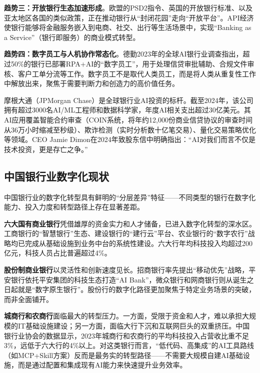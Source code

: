 \textbf{趋势三：开放银行生态加速形成}。欧盟的PSD2指令、英国的开放银行标准、以及亚太地区各国的类似政策，正在推动银行从``封闭花园''走向``开放平台''。API经济使银行能够将金融服务嵌入到电商、社交、出行等生活场景中，实现``Banking as a Service''（银行即服务）的商业模式转型。

\textbf{趋势四：数字员工与人机协作常态化}。德勤2023年的全球AI银行业调查指出，超过50\%的银行已部署RPA+AI的``数字员工''，用于处理信贷审批辅助、合规文件审核、客户工单分流等工作\parencite{deloitte2023banking}。数字员工不是取代人类员工，而是将人类从重复性工作中解放出来，聚焦于需要判断力和创造力的高价值任务。

\begin{casebox}[案例：摩根大通的AI战略]
摩根大通（JPMorgan Chase）是全球银行业AI投资的标杆。截至2024年，该公司拥有超过3000名AI/ML工程师和数据科学家，年度AI相关支出超过30亿美元。其AI应用覆盖智能合约审查（COIN系统，将年约12,000份商业信贷协议的审查时间从36万小时缩减至秒级）、欺诈检测（实时分析数十亿笔交易）、量化交易策略优化等领域。CEO Jamie Dimon在2024年致股东信中明确指出：``AI对我们而言不仅是技术投资，更是存亡之争。''
\end{casebox}

\subsection{中国银行业数字化现状}

中国银行业的数字化转型具有鲜明的``分层差异''特征——不同类型的银行在数字化能力、投入力度和转型路径上存在显著差距。

\textbf{六大国有商业银行}凭借雄厚的资金实力和人才储备，已进入数字化转型的深水区。工商银行的``智慧银行''生态、建设银行的``建行云''平台、农业银行的``数字农行''战略均已完成从基础设施到业务中台的系统性建设。六大行年均科技投入均超过200亿元，科技人员占比普遍超过4\%。

\textbf{股份制商业银行}以灵活性和创新速度见长。招商银行率先提出``移动优先''战略，平安银行依托平安集团的科技生态打造``AI Bank''，微众银行和网商银行则从诞生之日起就是``数字原生银行''。股份行的数字化路径更加聚焦于特定业务场景的突破，而非全面铺开。

\textbf{城商行和农商行}面临最大的转型压力。一方面，受限于资金和人才，难以承担大规模的IT基础设施建设；另一方面，面临大行下沉和互联网巨头的双重挤压。中国银行业协会的数据显示，2023年城商行和农商行的平均科技投入占营收比重不足3\%，远低于六大行的4\%以上\parencite{cba2024report}。对这类银行而言，``低代码、高集成''的AI工具路线（如MCP+Skill方案）反而是最务实的转型路径——不需要大规模自建AI基础设施，而是通过配置和集成现有AI能力来快速提升业务效率。

